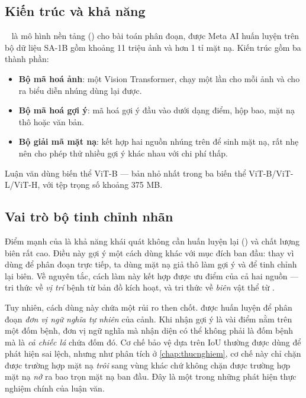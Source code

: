 \subsection{Kiến trúc và khả năng}

\SAM{}~\cite{kirillov2023sam} là mô hình nền tảng () cho bài
toán phân đoạn, được Meta AI huấn luyện trên bộ dữ liệu SA-1B gồm khoảng 11 triệu
ảnh và hơn 1 tỉ mặt nạ. Kiến trúc gồm ba thành phần:

\begin{itemize}
    \item \textbf{Bộ mã hoá ảnh}: một Vision Transformer, chạy một lần cho mỗi
          ảnh và cho ra biểu diễn nhúng dùng lại được.
    \item \textbf{Bộ mã hoá gợi ý}: mã hoá gợi ý đầu vào dưới dạng điểm, hộp bao,
          mặt nạ thô hoặc văn bản.
    \item \textbf{Bộ giải mã mặt nạ}: kết hợp hai nguồn nhúng trên để sinh mặt nạ,
          rất nhẹ nên cho phép thử nhiều gợi ý khác nhau với chi phí thấp.
\end{itemize}

Luận văn dùng biến thể ViT-B --- bản nhỏ nhất trong ba biến thể ViT-B/ViT-L/ViT-H,
với tệp trọng số khoảng 375 MB.

\subsection{Vai trò bộ tinh chỉnh nhãn}

Điểm mạnh của \SAM{} là khả năng khái quát không cần huấn luyện lại
() và chất lượng biên rất cao. Điều này gợi ý một cách dùng khác với
mục đích ban đầu: thay vì dùng \SAM{} để phân đoạn trực tiếp, ta dùng mặt nạ giả
thô làm gợi ý và để \SAM{} tinh chỉnh lại biên. Về nguyên tắc, cách làm này kết
hợp được ưu điểm của cả hai nguồn --- tri thức về \emph{vị trí} bệnh từ bản đồ
kích hoạt, và tri thức về \emph{biên} vật thể từ \SAM{}.

Tuy nhiên, cách dùng này chứa một rủi ro then chốt. \SAM{} được huấn luyện để phân
đoạn \emph{đơn vị ngữ nghĩa tự nhiên} của cảnh. Khi nhận gợi ý là vài điểm nằm
trên một đốm bệnh, đơn vị ngữ nghĩa mà \SAM{} nhận diện có thể không phải là đốm
bệnh mà là \emph{cả chiếc lá} chứa đốm đó. Cơ chế bảo vệ dựa trên IoU thường được
dùng để phát hiện sai lệch, nhưng như phân tích ở \cref{chap:thucnghiem}, cơ chế
này chỉ chặn được trường hợp mặt nạ \emph{trôi} sang vùng khác chứ không chặn được
trường hợp mặt nạ \emph{nở} ra bao trọn mặt nạ ban đầu. Đây là một trong những
phát hiện thực nghiệm chính của luận văn.

